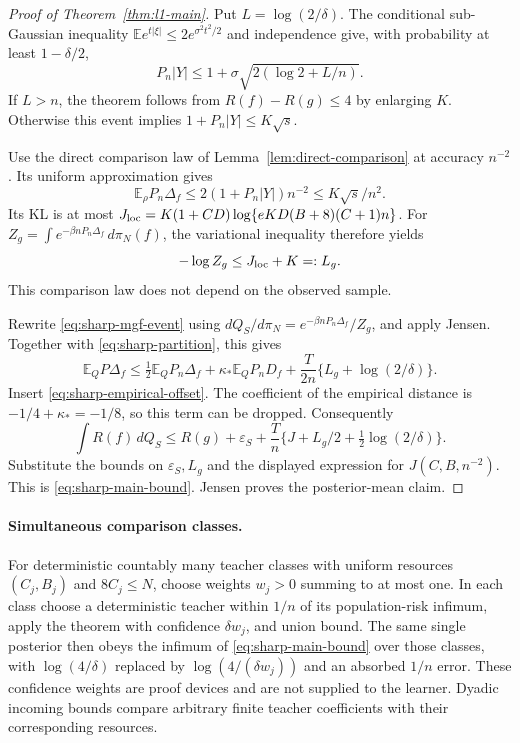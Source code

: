\begin{proof}[Proof of Theorem~\ref{thm:l1-main}]
Put $L=\log(2/\delta)$. The conditional sub-Gaussian inequality
$\mathbb E e^{t|\xi|}\le2e^{\sigma^2t^2/2}$ and independence give, with
probability at least $1-\delta/2$,
\[
 P_n|Y|\le1+\sigma\sqrt{2(\log2+L/n)}.
\]
If $L>n$, the theorem follows from $R(f)-R(g)\le4$ by enlarging $K$.
Otherwise this event implies $1+P_n|Y|\le K\sqrt s$.

Use the direct comparison law of Lemma~\ref{lem:direct-comparison}
at accuracy $n^{-2}$. Its uniform approximation gives
\[
 \mathbb E_\rho P_n\Delta_f\le2(1+P_n|Y|)n^{-2}
                         \le K\sqrt s/n^2.
\]
Its KL is at most
$J_{\rm loc}=K(1+CD)\log\{eKD(B+8)(C+1)n\}$.
For $Z_g=\int e^{-\beta nP_n\Delta_f}\,d\pi_N(f)$, the variational
inequality therefore yields
\begin{equation}
 -\log Z_g\le J_{\rm loc}+K=:L_g.
 \label{eq:sharp-partition}
\end{equation}
This comparison law does not depend on the observed sample.

Rewrite \eqref{eq:sharp-mgf-event} using
$dQ_S/d\pi_N=e^{-\beta nP_n\Delta_f}/Z_g$, and apply Jensen.
Together with \eqref{eq:sharp-partition}, this gives
\[
 \mathbb E_QP\Delta_f
 \le\tfrac12\mathbb E_QP_n\Delta_f+\kappa_*\mathbb E_QP_nD_f
            +\frac T{2n}\{L_g+\log(2/\delta)\}.
\]
Insert \eqref{eq:sharp-empirical-offset}. The coefficient of the
empirical distance is $-1/4+\kappa_*=-1/8$, so this term can be dropped.
Consequently
\[
 \int R(f)\,dQ_S\le R(g)+\varepsilon_S
        +\frac Tn\{J+L_g/2+\tfrac12\log(2/\delta)\}.
\]
Substitute the bounds on $\varepsilon_S,L_g$ and the displayed
expression for $J(C,B,n^{-2})$. This is
\eqref{eq:sharp-main-bound}. Jensen proves the posterior-mean claim.
\end{proof}

\paragraph{Simultaneous comparison classes.}
For deterministic countably many teacher classes with uniform resources
$(C_j,B_j)$ and $8C_j\le N$, choose weights $w_j>0$ summing to at most
one. In each class choose a deterministic teacher within $1/n$ of its
population-risk infimum, apply the theorem with confidence $\delta w_j$,
and union bound. The same single posterior then obeys the infimum of
\eqref{eq:sharp-main-bound} over those classes, with
$\log(4/\delta)$ replaced by $\log(4/(\delta w_j))$ and an absorbed
$1/n$ error. These confidence weights are proof devices and are not
supplied to the learner. Dyadic incoming bounds compare arbitrary finite
teacher coefficients with their corresponding resources.


